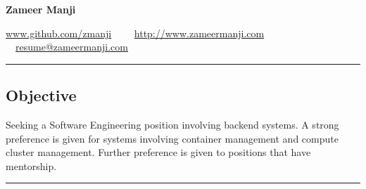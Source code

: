 \documentclass[10pt,letterpaper]{article}
\begin{document}
\begin{center}
{\huge \textbf{Zameer Manji}}


\href{http://www.github.com/zmanji/}{www.github.com/zmanji}\ \ \textbullet
\ \ \href{http://www.zameermanji.com}{http://www.zameermanji.com}\ \ \textbullet
\ \ \href{malto:resume@zameermanji.com}{resume@zameermanji.com}

\end{center}

\hrule
\vspace{-0.4em}
\subsection*{Objective}
Seeking a Software Engineering position involving backend systems. A strong
preference is given for systems involving container management and compute
cluster management. Further preference is given to positions that have
mentorship.
\\

\hrule
\vspace{-0.4em}
\end{document}
